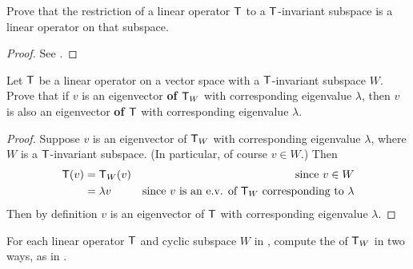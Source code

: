 \begin{exercise} \label{exercise 5.4.7}
Prove that the restriction of a linear operator \(\textsf{T}\) to a \(\textsf{T}\)-invariant subspace is a linear operator on that subspace.
\end{exercise}

\begin{proof}
See .
\end{proof}

\begin{exercise} \label{exercise 5.4.8}
Let \(\textsf{T}\) be a linear operator on a vector space with a \(\textsf{T}\)-invariant subspace \(W\).
Prove that if \(v\) is an eigenvector \textbf{of \(\textsf{T}_W\)} with corresponding eigenvalue \(\lambda\), then \(v\) is also an eigenvector \textbf{of \(\textsf{T}\)} with corresponding eigenvalue \(\lambda\).
\end{exercise}

\begin{proof}
Suppose \(v\) is an eigenvector of \(\textsf{T}_W\) with corresponding eigenvalue \(\lambda\), where \(W\) is a \(\textsf{T}\)-invariant subspace.
(In particular, of course \(v \in W\).)
Then
\begin{align*}
    \textsf{T}(v) & = \textsf{T}_W(v) & \text{since \(v \in W\)} \\
          & = \lambda v & \text{since \(v\) is an e.v. of \(\textsf{T}_W\) corresponding to \(\lambda\)}
\end{align*}
Then by definition \(v\) is an eigenvector of \(\textsf{T}\) with corresponding eigenvalue \(\lambda\).
\end{proof}

\begin{exercise} \label{exercise 5.4.9}
For each linear operator \(\textsf{T}\) and cyclic subspace \(W\) in , compute the \CPOLY{} of \(\textsf{T}_W\) in two ways, as in .
\end{exercise}

